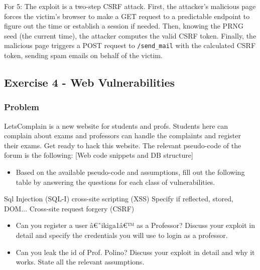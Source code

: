\documentclass{article}
\begin{document}
For 5: The exploit is a two-step CSRF attack. First, the attacker's malicious page forces the victim's browser to make a GET request to a predictable endpoint to figure out the time or establish a session if needed. Then, knowing the PRNG seed (the current time), the attacker computes the valid CSRF token. Finally, the malicious page triggers a POST request to \texttt{/send\_mail} with the calculated CSRF token, sending spam emails on behalf of the victim.

\subsection{Exercise 4 - Web Vulnerabilities}
\subsubsection*{Problem}
LetsComplain is a new website for students and profs. Students here can complain about exams and professors can handle the complaints and register their exams. Get ready to hack this website.
The relevant pseudo-code of the forum is the following:
[Web code snippets and DB structure]
\begin{itemize}
    \item[\textbf{1.}] [3 points] Based on the available pseudo-code and assumptions, fill out the following table by answering the questions for each class of vulnerabilities.
\end{itemize}
Sql Injection (SQL-I)
cross-site scripting (XSS) Specify if reflected, stored, DOM...
Cross-site request forgery (CSRF)

\begin{itemize}
    \item[\textbf{2.}] [1.5 points] Can you register a user â€˜ikiga1â€™ as a Professor? Discuss your exploit in detail and specify the credentials you will use to login as a professor.
    \item[\textbf{3.}] [1.5 points] Can you leak the id of Prof. Polino? Discuss your exploit in detail and why it works. State all the relevant assumptions.
\end{itemize}
\end{document}
